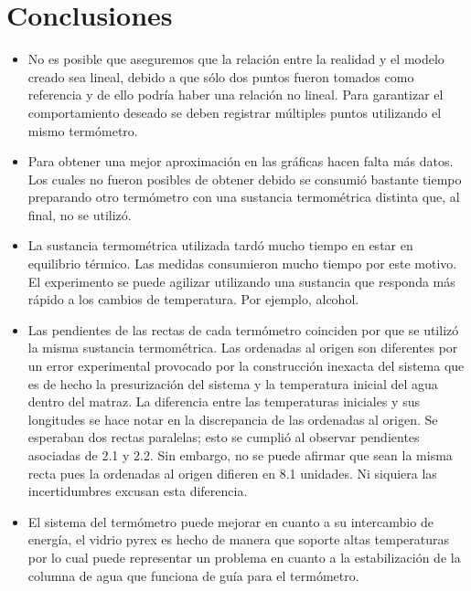 \documentclass{article}
\begin{document}
\section*{Conclusiones}
\begin{itemize}
    \item No es posible que aseguremos que la relación entre la realidad y  el modelo creado sea lineal, debido a que sólo dos puntos fueron tomados como referencia y de ello podría haber una relación no lineal. Para garantizar el comportamiento deseado se deben registrar múltiples puntos utilizando el mismo termómetro.
    \item Para obtener una mejor aproximación en las gráficas hacen falta más datos. Los cuales no fueron posibles de obtener debido se consumió bastante tiempo preparando otro termómetro con una sustancia termométrica distinta que, al final, no se utilizó.
    \item La sustancia termométrica utilizada tardó mucho tiempo en estar en equilibrio térmico. Las medidas consumieron mucho tiempo por este motivo. El experimento se puede agilizar utilizando una sustancia que responda más rápido a los cambios de temperatura. Por ejemplo, alcohol.
    \item Las pendientes de las rectas de cada termómetro coinciden por que se utilizó la misma sustancia termométrica. Las ordenadas al origen son diferentes por un error experimental provocado por la construcción inexacta del sistema que es de hecho la presurización del sistema y la temperatura inicial del agua dentro del matraz. La diferencia entre las temperaturas iniciales y sus longitudes se hace notar en la discrepancia de las ordenadas al origen. Se esperaban dos rectas paralelas; esto se cumplió al observar pendientes asociadas de 2.1 y 2.2. Sin embargo, no se puede afirmar que sean la misma recta pues la ordenadas al origen difieren en 8.1 unidades. Ni siquiera las incertidumbres excusan esta diferencia.
    \item El sistema del termómetro puede mejorar en cuanto a su intercambio de energía, el vidrio pyrex es hecho de manera que soporte altas temperaturas por lo cual puede representar un problema en cuanto a la estabilización de la columna de agua que funciona de guía para el termómetro. 

\end{itemize}
\end{document}
